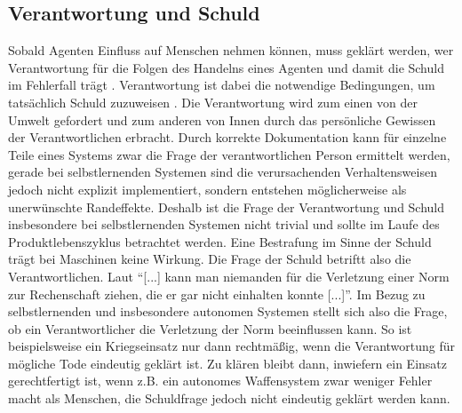 \subsection{Verantwortung und Schuld}\label{sub:verantwortung}
Sobald Agenten Einfluss auf Menschen nehmen können, muss geklärt werden, wer Verantwortung für die Folgen des Handelns eines Agenten und damit die Schuld im Fehlerfall trägt \cite[S. 88]{heckman1998}.
Verantwortung ist dabei die notwendige Bedingungen, um tatsächlich Schuld zuzuweisen \cite[S. 75]{duttge2009}.
Die Verantwortung wird zum einen von der Umwelt gefordert \cite[S. 1]{hoffrage2019} und zum anderen von Innen durch das persönliche Gewissen der Verantwortlichen erbracht.
Durch korrekte Dokumentation kann für einzelne Teile eines Systems zwar die Frage der verantwortlichen Person ermittelt werden, gerade bei selbstlernenden Systemen sind die verursachenden Verhaltensweisen jedoch nicht explizit implementiert, sondern entstehen möglicherweise als unerwünschte Randeffekte.
Deshalb ist die Frage der Verantwortung und Schuld insbesondere bei selbstlernenden Systemen nicht trivial und sollte im Laufe des Produktlebenszyklus betrachtet werden.
Eine Bestrafung im Sinne der Schuld trägt bei Maschinen keine Wirkung.
Die Frage der Schuld betriftt also die Verantwortlichen.
Laut \cite[S. 76]{duttge2009} \enquote{[...] kann man niemanden für die Verletzung einer Norm zur Rechenschaft ziehen, die er gar nicht einhalten konnte [...]}.
Im Bezug zu selbstlernenden und insbesondere autonomen Systemen stellt sich also die Frage, ob ein Verantwortlicher die Verletzung der Norm beeinflussen kann.
So ist beispielsweise ein Kriegseinsatz nur dann rechtmäßig, wenn die Verantwortung für mögliche Tode eindeutig geklärt ist.
Zu klären bleibt dann, inwiefern ein Einsatz gerechtfertigt ist, wenn z.B. ein autonomes Waffensystem zwar weniger Fehler macht als Menschen, die Schuldfrage jedoch nicht eindeutig geklärt werden kann.
